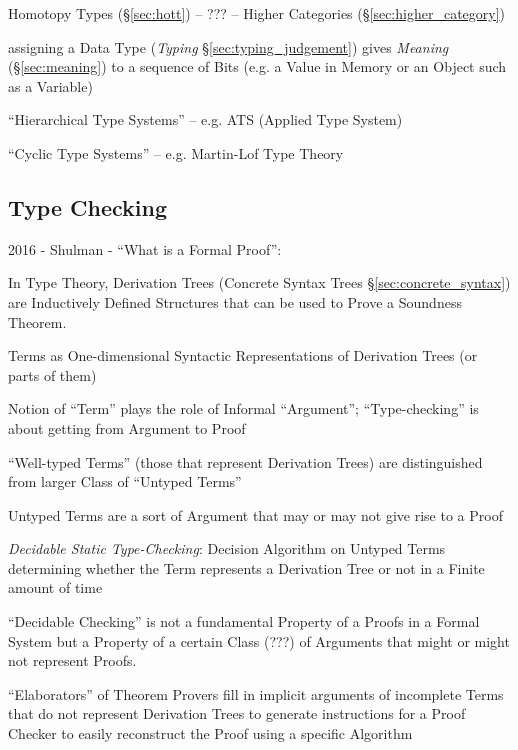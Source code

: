 Homotopy Types (\S\ref{sec:hott}) -- ??? -- Higher Categories
(\S\ref{sec:higher_category})

assigning a Data Type (\emph{Typing} \S\ref{sec:typing_judgement})
gives \emph{Meaning} (\S\ref{sec:meaning}) to a sequence of Bits (e.g.
a Value in Memory or an Object such as a Variable)

``Hierarchical Type Systems'' -- e.g. ATS (Applied Type System)

``Cyclic Type Systems'' -- e.g. Martin-Lof Type Theory



\subsection{Type Checking}\label{sec:type_checking}

2016 - Shulman - ``What is a Formal Proof'': %

In Type Theory, Derivation Trees (Concrete Syntax Trees
\S\ref{sec:concrete_syntax}) are Inductively Defined Structures that
can be used to Prove a Soundness Theorem.

Terms as One-dimensional Syntactic Representations of Derivation Trees
(or parts of them)

Notion of ``Term'' plays the role of Informal ``Argument'';
``Type-checking'' is about getting from Argument to Proof

``Well-typed Terms'' (those that represent Derivation Trees) are
distinguished from larger Class of ``Untyped Terms''

Untyped Terms are a sort of Argument that may or may not give rise to
a Proof

\emph{Decidable Static Type-Checking}: Decision Algorithm on Untyped
Terms determining whether the Term represents a Derivation Tree or not
in a Finite amount of time

``Decidable Checking'' is not a fundamental Property of a Proofs in a
Formal System but a Property of a certain Class (???) of Arguments
that might or might not represent Proofs.

``Elaborators'' of Theorem Provers fill in implicit arguments of
incomplete Terms that do not represent Derivation Trees to generate
instructions for a Proof Checker to easily reconstruct the Proof using
a specific Algorithm



